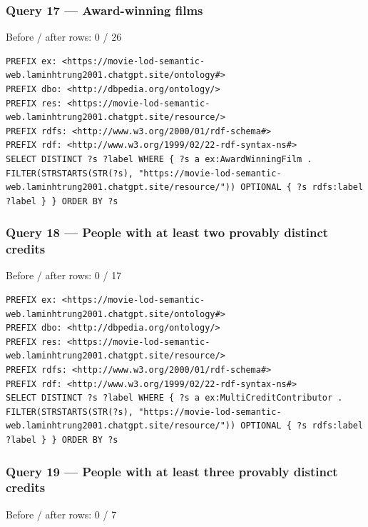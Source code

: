 \documentclass[
  11pt,
]{article}
\begin{document}
\subsubsection{\texorpdfstring{Query 17 ---
Award-\allowbreak{}wi\allowbreak{}nning
films}{Query 17 ---  films}}\label{query-17-award-winning-films}

Before / after rows: 0 / 26

\begin{verbatim}
PREFIX ex: <https://movie-lod-semantic-web.laminhtrung2001.chatgpt.site/ontology#>
PREFIX dbo: <http://dbpedia.org/ontology/>
PREFIX res: <https://movie-lod-semantic-web.laminhtrung2001.chatgpt.site/resource/>
PREFIX rdfs: <http://www.w3.org/2000/01/rdf-schema#>
PREFIX rdf: <http://www.w3.org/1999/02/22-rdf-syntax-ns#>
SELECT DISTINCT ?s ?label WHERE { ?s a ex:AwardWinningFilm . FILTER(STRSTARTS(STR(?s), "https://movie-lod-semantic-web.laminhtrung2001.chatgpt.site/resource/")) OPTIONAL { ?s rdfs:label ?label } } ORDER BY ?s
\end{verbatim}

\subsubsection{Query 18 --- People with at least two provably distinct
credits}\label{query-18-people-with-at-least-two-provably-distinct-credits}

Before / after rows: 0 / 17

\begin{verbatim}
PREFIX ex: <https://movie-lod-semantic-web.laminhtrung2001.chatgpt.site/ontology#>
PREFIX dbo: <http://dbpedia.org/ontology/>
PREFIX res: <https://movie-lod-semantic-web.laminhtrung2001.chatgpt.site/resource/>
PREFIX rdfs: <http://www.w3.org/2000/01/rdf-schema#>
PREFIX rdf: <http://www.w3.org/1999/02/22-rdf-syntax-ns#>
SELECT DISTINCT ?s ?label WHERE { ?s a ex:MultiCreditContributor . FILTER(STRSTARTS(STR(?s), "https://movie-lod-semantic-web.laminhtrung2001.chatgpt.site/resource/")) OPTIONAL { ?s rdfs:label ?label } } ORDER BY ?s
\end{verbatim}

\subsubsection{Query 19 --- People with at least three provably distinct
credits}\label{query-19-people-with-at-least-three-provably-distinct-credits}

Before / after rows: 0 / 7
\end{document}
